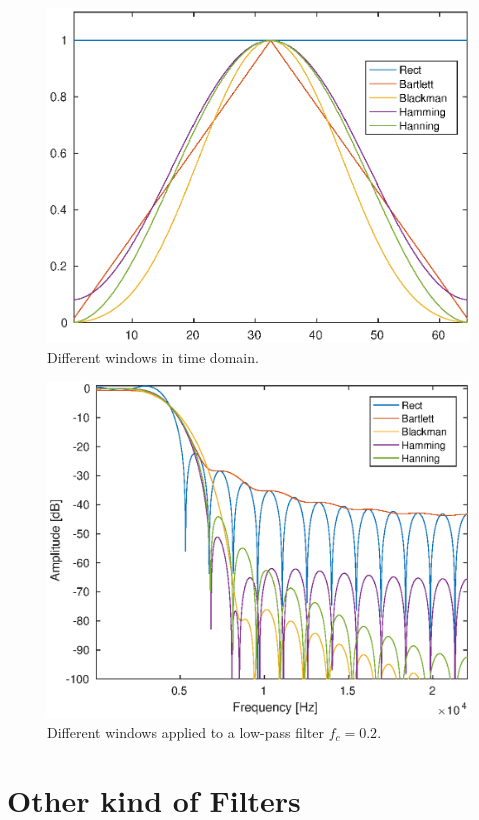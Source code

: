 \documentclass[twoside,twocolumn]{article}
\begin{document}
\begin{figure}[h!]
	\centering
	\includegraphics[scale=0.45]{./images/windows.eps}
	\caption{Different windows in time domain.}
	\label{windows}
\end{figure}
\begin{figure}[h!]
	\centering
	\includegraphics[scale=0.45]{./images/windows_fft.eps}
	\caption{Different windows applied to a low-pass filter $f_c=0.2$.}
	\label{windowsfft}
\end{figure}

\section{Other kind of Filters}
\end{document}
